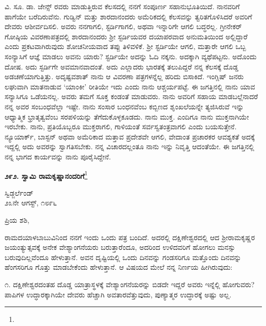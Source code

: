 ವಿ. ಸೂ.\enginline{-} ಡಾ. ಜೇನ್ಸ್ ರವರು ಮಾಡುತ್ತಿರುವ ಕೆಲಸದಲ್ಲಿ ನನಗೆ ಸಂಪೂರ್ಣ ಸಹಾನುಭೂತಿಯಿದೆ. ನಾನವರಿಗೆ ಹಾಗೆಯೇ ಬರೆದಿರುವೆನು. ಗುಡ್ವಿನ್ ಮತ್ತು ಶಾರದಾನಂದರು ಅಮೆರಿಕದಲ್ಲಿ ಕೆಲಸವನ್ನು ತ್ವರಿತಗೊಳಿಸಿದರೆ ಅವರಿಗೆ ದೇವರು ಆಶೀರ್ವದಿಸಲಿ. ಅವರು ನನಗಾಗಲಿ, ಸ್ಟರ್ಡಿಗಾಗಲಿ, ಅಥವಾ ಇನ್ನಾರಿಗೇ ಆಗಲಿ ಬದ್ಧರಲ್ಲ. ಗ್ರೀನೇಕರ್‌ ಗೋಷ್ಠಿಯ ವಿವರಣಾಪತ್ರದಲ್ಲಿ ಶಾರದಾನಂದರು ಶ‍್ರೀ ಸ್ಟರ್ಡಿಯವರ ದಯಾಪರವಾದ ಅನುಮತಿಯಿಂದ ಅಲ್ಲಿದ್ದಾರೆ ಎಂದು ಪ್ರಕಟವಾಗಿರುವುದು ಶೋಚನೀಯವಾದ ತಪ್ಪು ತಿಳಿವಳಿಕೆ. ಶ‍್ರೀ ಸ್ಟರ್ಡಿಯೇ ಆಗಲಿ, ಮತ್ತಾರೇ ಆಗಲಿ ಒಬ್ಬ ಸಂನ್ಯಾಸಿಗೆ ಆಜ್ಞೆ ಮಾಡಲು ಅವನು ಯಾರು? ಸ್ಟರ್ಡಿಯೇ ಅದನ್ನು ಓದಿ ನಕ್ಕನು. ಅದಕ್ಕಾಗಿ ವ್ಯಥೆಪಟ್ಟನು. ಅದೊಂದು ದೋಷ. ಅದು ಸ್ಟರ್ಡಿಗೇ ಅವಮಾನವಾದಂತೆ. ಅದು ಎಲ್ಲಾದರು ಭಾರತಕ್ಕೆ ತಲುಪಿದ್ದರೆ ನನ್ನ ಕೆಲಸಕ್ಕೆ ದೊಡ್ಡ ಅಡಚಣೆಯಾಗುತ್ತಿತ್ತು. ಅದೃಷ್ಟವಶಾತ್ ನಾನು ಆ ವಿವರಣಾ ಪತ್ರಗಳನ್ನೆಲ್ಲ ಹರಿದು ಬಿಸಾಕಿದೆ. ಇಂಗ್ಲಿಷ್ ಜನರು ಲಘುವಾಗಿ ಮಾತನಾಡುವ ‘ಯಾಂಕೀ’ ರೀತಿಯೇ ಇದು\enginline{-} ಎಂದು ನಾನು ಆಶ್ಚರ್ಯಪಟ್ಟೆ. ಈ ಜಗತ್ತಿನಲ್ಲಿ ನಾನು ಯಾವ ಸನ್ಯಾಸಿಗೂ ಒಡೆಯನಲ್ಲ. ಅವರು ತಮಗೆ ಸೂಕ್ತ ಕಂಡಂತೆ ಮಾಡುವರು. ನಾನು ಅವರಿಗೆ ಸಹಾಯ ಮಾಡಬಲ್ಲೆನಾದರೆ\enginline{-} ನನ್ನ ಅವರ ಸಂಬಂಧವೆಲ್ಲಾ ಇಷ್ಟೇ. ನಾನು ಸಂಸಾರ ಬಂಧನವೆಂಬ ಕಬ್ಬಿಣದ ಶೃಂಖಲೆಯನ್ನೇ ತ್ಯಜಿಸಿರುವೆ\enginline{-} ಇನ್ನು ಆಧ್ಯಾತ್ಮಿಕ ಭ್ರಾತೃತ್ವವೆಂಬ ಸರಪಳಿಯನ್ನು ತೆಗೆದುಕೊಳ್ಳಕೂಡದು. ನಾನು ಮುಕ್ತ. ಎಂದಿಗೂ ನಾನು ಮುಕ್ತನಾಗಿಯೇ ಇರಬೇಕು. ನಾನು, ಪ್ರತಿಯೊಬ್ಬರೂ ಮುಕ್ತರಾಗಲಿ, ಗಾಳಿಯಂತೆ ಸರ್ವಸ್ವತಂತ್ರವಾಗಲಿ ಎಂದು ಬಯಸುತ್ತೇನೆ. ನ್ಯೂಯಾರ್ಕ್, ಬಾಸ್ಟನ್ ಅಥವಾ ಅಮೆರಿಕಾದ ಮತ್ತಾವ ಪ್ರದೇಶವೇ ಆಗಲಿ, ವೇದಾಂತ ಪ್ರಚಾರಕರ ಆವಶ್ಯಕತೆ ಅದಕ್ಕೆ ಇದ್ದಲ್ಲಿ ಅದು ಅವರನ್ನು ಸ್ವಾಗತಿಸಬೇಕು. ನನ್ನ ವಿಚಾರದಲ್ಲಂತೂ ನಾನು ಇನ್ನು ನಿವೃತ್ತಿ ಆದಂತೆಯೇ. ಈ ಜಗತ್ತಿನಲ್ಲಿ ನನ್ನ ಭಾಗದ ಕಾರ್ಯವನ್ನು ನಾನು ಪೂರೈಸಿದ್ದೇನೆ.

\begin{center}
\textbf{೨೯೨. ಸ್ವಾಮಿ ರಾಮಕೃಷ್ಣಾನಂದರಿಗೆ}\footnote{}
\end{center}

\vspace{-0.5cm}

\begin{flushright}
ಸ್ವಿಡ್ಜರ್ಲೆಂಡ್\\೨೩ನೇ ಆಗಸ್ಟ್, ೧೮೯೬
\end{flushright}

\vspace{-0.3cm}

\noindent
ಪ್ರಿಯ ಶಶಿ,

ರಾಮದಯಾಳಬಾಬುವಿನಿಂದ ನನಗೆ ಇಂದು ಒಂದು ಪತ್ರ ಬಂದಿದೆ. ಅದರಲ್ಲಿ ದಕ್ಷಿಣೇಶ್ವರದಲ್ಲಿ ಆದ ಶ‍್ರೀರಾಮಕೃಷ್ಣರ ಜಯಂತ್ಯುತ್ಸವಕ್ಕೆ ಅನೇಕ ವೇಶ್ಯಾಂಗನೆಯರು ಬರುತ್ತಾರೆಂದೂ, ಅದರಿಂದ ಉಳಿದವರಿಗೆ ಹೋಗಲು ಮನಸ್ಸು ಬರುವುದಿಲ್ಲವೆಂದೂ ಹೇಳುತ್ತಾನೆ. ಅವನ ದೃಷ್ಟಿಯಲ್ಲಿ ಒಂದು ದಿನವನ್ನು ಗಂಡಸರಿಗೂ ಮತ್ತೊಂದು ದಿನವನ್ನು ಹೆಂಗಸರಿಗೂ ಗೊತ್ತು ಮಾಡಬೇಕೆಂದು ಹೇಳುತ್ತಾನೆ. ಆ ವಿಷಯದ ಮೇಲೆ ನನ್ನ ನಿರ್ಣಯ ಹೀಗಿರುವುದು:

೧. ದಕ್ಷಿಣೇಶ್ವರದಂತಹ ದೊಡ್ಡ ಯಾತ್ರಾಸ್ಥಳಕ್ಕೆ ವೇಶ್ಯಾಂಗನೆಯರನ್ನು ಬಿಡದೇ ಇದ್ದರೆ ಅವರು ಇನ್ನೆಲ್ಲಿ ಹೋಗುವರು? ಪಾಪಿಗಳ ಉದ್ಧಾರಕ್ಕಾಗಿಯೇ ದೇವರು ಹೆಚ್ಚಾಗಿ ಅವತಾರವೆತ್ತುವುದು, ಪುಣ್ಯಾತ್ಮರ ಉದ್ಧಾರಕ್ಕೆ ಅಷ್ಟು ಅಲ್ಲ.

